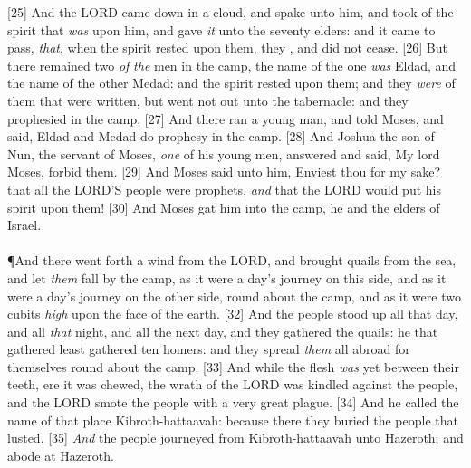 [25] \textcolor[cmyk]{0.99998,1,0,0}{And the LORD came down in a cloud, and spake unto him, and took of the spirit that \emph{was} upon him, and gave \emph{it} unto the seventy elders: and it came to pass, \emph{that}, when the spirit rested upon them, they , and did not cease.}
[26] \textcolor[cmyk]{0.99998,1,0,0}{But there remained two \emph{of} \emph{the} men in the camp, the name of the one \emph{was} Eldad, and the name of the other Medad: and the spirit rested upon them; and they \emph{were} of them that were written, but went not out unto the tabernacle: and they prophesied in the camp.}
[27] \textcolor[cmyk]{0.99998,1,0,0}{And there ran a young man, and told Moses, and said, Eldad and Medad do prophesy in the camp.}
[28] \textcolor[cmyk]{0.99998,1,0,0}{And Joshua the son of Nun, the servant of Moses, \emph{one} of his young men, answered and said, My lord Moses, forbid them.}
[29] \textcolor[cmyk]{0.99998,1,0,0}{And Moses said unto him, Enviest thou for my sake?  that all the LORD'S people were prophets, \emph{and} that the LORD would put his spirit upon them!}
[30] \textcolor[cmyk]{0.99998,1,0,0}{And Moses gat him into the camp, he and the elders of Israel.}\\
\\
\P \textcolor[cmyk]{0.99998,1,0,0}{And there went forth a wind from the LORD, and brought quails from the sea, and let \emph{them} fall by the camp, as it were a day's journey on this side, and as it were a day's journey on the other side, round about the camp, and as it were two cubits \emph{high} upon the face of the earth.}
[32] \textcolor[cmyk]{0.99998,1,0,0}{And the people stood up all that day, and all \emph{that} night, and all the next day, and they gathered the quails: he that gathered least gathered ten homers: and they spread \emph{them} all abroad for themselves round about the camp.}
[33] \textcolor[cmyk]{0.99998,1,0,0}{And while the flesh \emph{was} yet between their teeth, ere it was chewed, the wrath of the LORD was kindled against the people, and the LORD smote the people with a very great plague.}
[34] \textcolor[cmyk]{0.99998,1,0,0}{And he called the name of that place Kibroth-hattaavah: because there they buried the people that lusted.}
[35] \textcolor[cmyk]{0.99998,1,0,0}{\emph{And} the people journeyed from Kibroth-hattaavah unto Hazeroth; and abode at Hazeroth.}